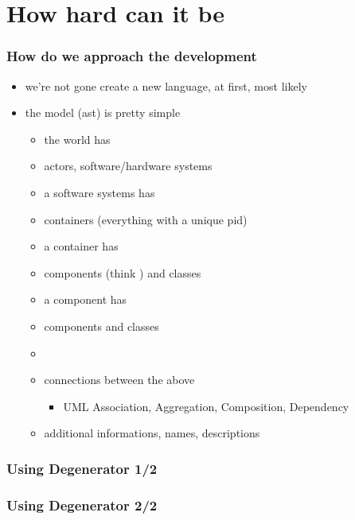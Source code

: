 \documentclass[xelatex,13pt]{beamer}
\begin{document}
\section{How hard can it be}
\begin{frame}
	\frametitle{How do we approach the development}
	\begin{itemize}
		\item we're not gone create a new language\pause, at first\pause,
			most likely
		\item the model (ast) is pretty simple
		\begin{itemize}
			\item the world has
			\item actors, software/hardware systems
			\item a software systems has
			\item containers (everything with a unique pid)
			\item a container has
			\item components (think \lstinline@module@) and classes
			\item a component has
			\item components and classes
			\item[]
			\item connections between the above
			\begin{itemize}
				\item UML Association, Aggregation, Composition, Dependency
			\end{itemize}
			\item additional informations, names, descriptions
		\end{itemize}
	\end{itemize}
\end{frame}

\begin{frame}
	\frametitle{Using Degenerator 1/2}
	
	\pause
	
	\pause
	
	\pause
	
\end{frame}

\begin{frame}
	\frametitle{Using Degenerator 2/2}
	
	\pause
	
	\pause
	
\end{frame}
\end{document}
